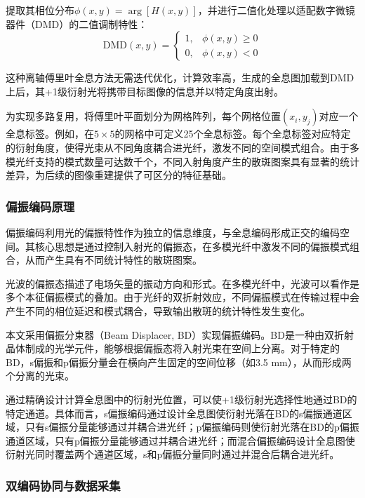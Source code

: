 {提取其相位分布$\phi(x,y) = \arg[H(x,y)]$，并进行二值化处理以适配数字微镜器件（DMD）的二值调制特性：
\begin{equation}
\text{DMD}(x,y) = \begin{cases} 1, & \phi(x,y) \geq 0 \\ 0, & \phi(x,y) < 0 \end{cases}
\end{equation}

这种离轴傅里叶全息方法无需迭代优化，计算效率高，生成的全息图加载到DMD上后，其+1级衍射光将携带目标图像的信息并以特定角度出射。

为实现多路复用，将傅里叶平面划分为网格阵列，每个网格位置$(x_i, y_j)$对应一个全息标签。例如，在$5\times5$的网格中可定义25个全息标签。每个全息标签对应特定的衍射角度，使得光束从不同角度耦合进光纤，激发不同的空间模式组合。由于多模光纤支持的模式数量可达数千个，不同入射角度产生的散斑图案具有显著的统计差异，为后续的图像重建提供了可区分的特征基础。

\subsubsection{偏振编码原理}

偏振编码利用光的偏振特性作为独立的信息维度，与全息编码形成正交的编码空间。其核心思想是通过控制入射光的偏振态，在多模光纤中激发不同的偏振模式组合，从而产生具有不同统计特性的散斑图案。

光波的偏振态描述了电场矢量的振动方向和形式。在多模光纤中，光波可以看作是多个本征偏振模式的叠加。由于光纤的双折射效应，不同偏振模式在传输过程中会产生不同的相位延迟和模式耦合，导致输出散斑的统计特性发生变化。

本文采用偏振分束器（Beam Displacer, BD）实现偏振编码。BD是一种由双折射晶体制成的光学元件，能够根据偏振态将入射光束在空间上分离。对于特定的BD，s偏振和p偏振分量会在横向产生固定的空间位移（如3.5 mm），从而形成两个分离的光束。

通过精确设计计算全息图中的衍射光位置，可以使+1级衍射光选择性地通过BD的特定通道。具体而言，s偏振编码通过设计全息图使衍射光落在BD的s偏振通道区域，只有s偏振分量能够通过并耦合进光纤；p偏振编码则使衍射光落在BD的p偏振通道区域，只有p偏振分量能够通过并耦合进光纤；而混合偏振编码设计全息图使衍射光同时覆盖两个通道区域，s和p偏振分量同时通过并混合后耦合进光纤。

\subsubsection{双编码协同与数据采集}

}
